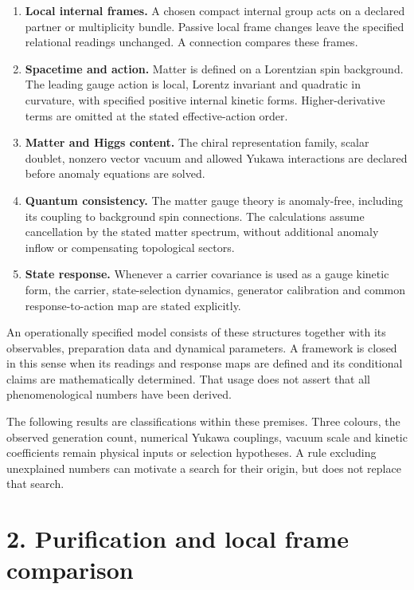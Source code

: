 \documentclass[
  11pt,
  a4paper,
]{article}
\providecommand{\tightlist}{%
  \setlength{\itemsep}{0pt}\setlength{\parskip}{0pt}}
\begin{document}
\begin{enumerate}
\def\labelenumi{\arabic{enumi}.}
\tightlist
\item
  \textbf{Local internal frames.} A chosen compact internal group acts on a declared partner or multiplicity bundle. Passive local frame changes leave the specified relational readings unchanged. A connection compares these frames.
\item
  \textbf{Spacetime and action.} Matter is defined on a Lorentzian spin background. The leading gauge action is local, Lorentz invariant and quadratic in curvature, with specified positive internal kinetic forms. Higher-derivative terms are omitted at the stated effective-action order.
\item
  \textbf{Matter and Higgs content.} The chiral representation family, scalar doublet, nonzero vector vacuum and allowed Yukawa interactions are declared before anomaly equations are solved.
\item
  \textbf{Quantum consistency.} The matter gauge theory is anomaly-free, including its coupling to background spin connections. The calculations assume cancellation by the stated matter spectrum, without additional anomaly inflow or compensating topological sectors.
\item
  \textbf{State response.} Whenever a carrier covariance is used as a gauge kinetic form, the carrier, state-selection dynamics, generator calibration and common response-to-action map are stated explicitly.
\end{enumerate}

An operationally specified model consists of these structures together with its observables, preparation data and dynamical parameters. A framework is closed in this sense when its readings and response maps are defined and its conditional claims are mathematically determined. That usage does not assert that all phenomenological numbers have been derived.

The following results are classifications within these premises. Three colours, the observed generation count, numerical Yukawa couplings, vacuum scale and kinetic coefficients remain physical inputs or selection hypotheses. A rule excluding unexplained numbers can motivate a search for their origin, but does not replace that search.

\section{2. Purification and local frame comparison}\label{purification-and-local-frame-comparison}
\end{document}
